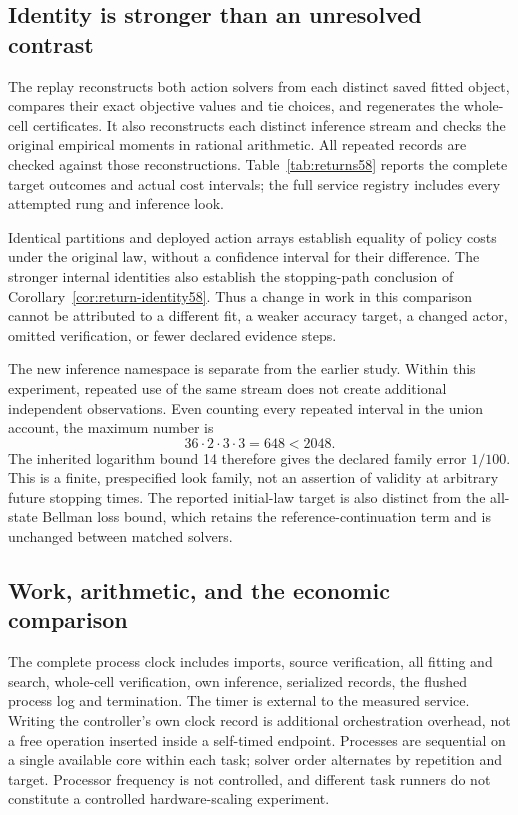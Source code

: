 

\subsection{Identity is stronger than an unresolved contrast}
The replay reconstructs both action solvers from each distinct saved fitted object, compares their exact objective values and tie choices, and regenerates the whole-cell certificates. It also reconstructs each distinct inference stream and checks the original empirical moments in rational arithmetic. All repeated records are checked against those reconstructions. Table~\ref{tab:returns58} reports the complete target outcomes and actual cost intervals; the full service registry includes every attempted rung and inference look.

Identical partitions and deployed action arrays establish equality of policy costs under the original law, without a confidence interval for their difference. The stronger internal identities also establish the stopping-path conclusion of Corollary~\ref{cor:return-identity58}. Thus a change in work in this comparison cannot be attributed to a different fit, a weaker accuracy target, a changed actor, omitted verification, or fewer declared evidence steps.

The new inference namespace is separate from the earlier study. Within this experiment, repeated use of the same stream does not create additional independent observations. Even counting every repeated interval in the union account, the maximum number is
\[
 36\cdot2\cdot3\cdot3=648<2048.
\]
The inherited logarithm bound 14 therefore gives the declared family error $1/100$. This is a finite, prespecified look family, not an assertion of validity at arbitrary future stopping times. The reported initial-law target is also distinct from the all-state Bellman loss bound, which retains the reference-continuation term and is unchanged between matched solvers.

\subsection{Work, arithmetic, and the economic comparison}
The complete process clock includes imports, source verification, all fitting and search, whole-cell verification, own inference, serialized records, the flushed process log and termination. The timer is external to the measured service. Writing the controller's own clock record is additional orchestration overhead, not a free operation inserted inside a self-timed endpoint. Processes are sequential on a single available core within each task; solver order alternates by repetition and target. Processor frequency is not controlled, and different task runners do not constitute a controlled hardware-scaling experiment.

